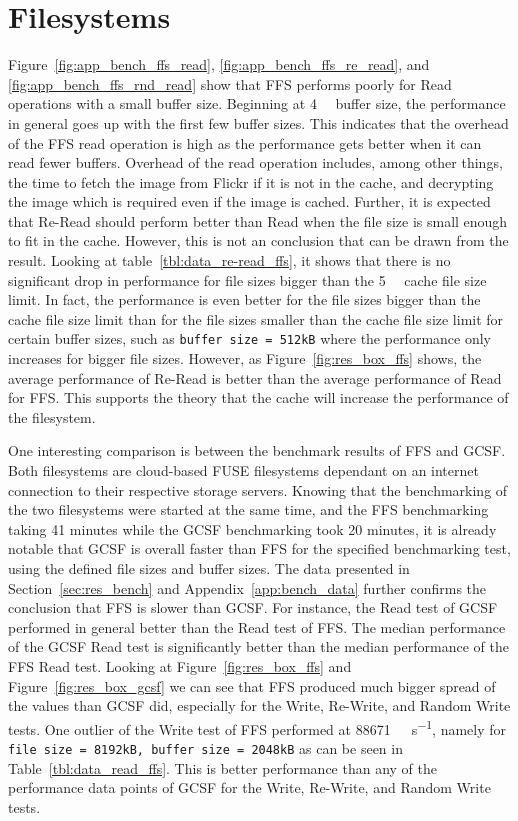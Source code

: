 \section{Filesystems}
Figure~\ref{fig:app_bench_ffs_read}, \ref{fig:app_bench_ffs_re_read}, and \ref{fig:app_bench_ffs_rnd_read} show that FFS performs poorly for Read operations with a small buffer size. Beginning at \SI{4}{\kilo\byte} buffer size, the performance in general goes up with the first few buffer sizes. This indicates that the overhead of the FFS read operation is high as the performance gets better when it can read fewer buffers. Overhead of the read operation includes, among other things, the time to fetch the image from Flickr if it is not in the cache, and decrypting the image which is required even if the image is cached. Further, it is expected that Re-Read should perform better than Read when the file size is small enough to fit in the cache. However, this is not an conclusion that can be drawn from the result. Looking at table~\ref{tbl:data_re-read_ffs}, it shows that there is no significant drop in performance for file sizes bigger than the \SI{5}{\mega\byte} cache file size limit. In fact, the performance is even better for the file sizes bigger than the cache file size limit than for the file sizes smaller than the cache file size limit for certain buffer sizes, such as \texttt{buffer size = 512kB} where the performance only increases for bigger file sizes. However, as Figure~\ref{fig:res_box_ffs} shows, the average performance of Re-Read is better than the average performance of Read for FFS. This supports the theory that the cache will increase the performance of the filesystem.

One interesting comparison is between the benchmark results of FFS and GCSF. Both filesystems are cloud-based FUSE filesystems dependant on an internet connection to their respective storage servers. Knowing that the benchmarking of the two filesystems were started at the same time, and the FFS benchmarking taking 41 minutes while the GCSF benchmarking took 20 minutes, it is already notable that GCSF is overall faster than FFS for the specified benchmarking test, using the defined file sizes and buffer sizes. The data presented in Section~\ref{sec:res_bench} and Appendix~\ref{app:bench_data} further confirms the conclusion that FFS is slower than GCSF. For instance, the Read test of GCSF performed in general better than the Read test of FFS. The median performance of the GCSF Read test is significantly better than the median performance of the FFS Read test. Looking at Figure~\ref{fig:res_box_ffs} and Figure~\ref{fig:res_box_gcsf} we can see that FFS produced much bigger spread of the values than GCSF did, especially for the Write, Re-Write, and Random Write tests. One outlier of the Write test of FFS performed at \SI[per-mode = symbol]{88671}{\kilo\byte\per\second}, namely for \texttt{file size = 8192kB, buffer size = 2048kB} as can be seen in Table~\ref{tbl:data_read_ffs}. This is better performance than any of the performance data points of GCSF for the Write, Re-Write, and Random Write tests.

